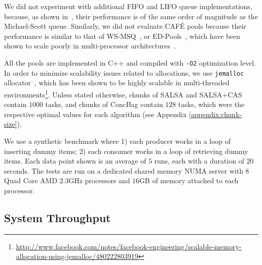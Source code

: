 We did not experiment with additional FIFO and LIFO queue implementations, because, as shown in~\cite{Sundell:2011:LAC:1989493.1989550}, their performance is of the same order of magnitude as the Michael-Scott queue. 
Similarly, we did not evaluate {CAF\'E}\cite{Basin:2011:CST:2075029.2075087} pools because their performance is similar to that of WS-MSQ~\cite{Basin:Thesis:2011}, or ED-Pools~\cite{Afek:2010:SPP:1885276.1885295}, which have been shown to scale poorly in multi-processor architectures~\cite{Basin:Thesis:2011,Sundell:2011:LAC:1989493.1989550}. 

All the pools are implemented in C++ and compiled with \texttt{-O2} optimization level. 
In order to minimize scalability issues related to allocations, we use \texttt{jemalloc} allocator~\cite{citeulike:4951109}, which has been shown to be highly scalable in multi-threaded environments\footnote{\url{http://www.facebook.com/notes/facebook-engineering/scalable-memory-allocation-using-jemalloc/480222803919}}.
Unless stated otherwise, chunks of SALSA and SALSA+CAS contain $1000$ tasks, and chunks of ConcBag contain $128$ tasks, which were the respective optimal values for each algorithm (see Appendix \ref{appendix:chunk-size}). 

We use a synthetic benchmark where 1) each producer works in a loop of inserting dummy items; 2) each consumer works in a loop of retrieving dummy items. Each data point shown is an average of $5$ runs, each with a duration of $20$ seconds. 
The tests are run on a dedicated shared memory NUMA server with $8$ Quad Core AMD $2.3$GHz processors and $16$GB of memory attached to each processor. 

\subsection{System Throughput}
\label{sec:eval-performance}

